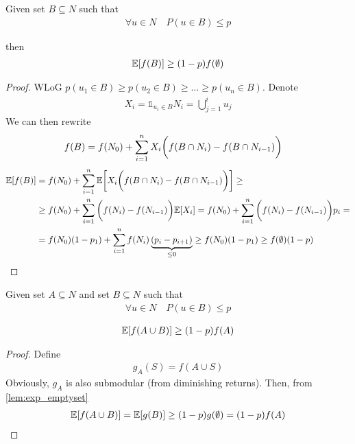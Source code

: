 \begin{lemma} \label{lem:exp_emptyset}
	Given  set $B\subseteq N$ such that
	\begin{align}
	\forall u \in  N \quad P(u\in B) \leq p
	\end{align}
	
	then
	\begin{align}
	\mathbb{E} \qty[f(B)] \geq (1-p)f(\emptyset)
	\end{align}
	\begin{proof}
		WLoG $p(u_1\in B) \geq p(u_2\in B) \geq \dots \geq p(u_n\in B)$. Denote 
		\begin{align}
		X_i = \mathds{1}_{u_i \in B}
		N_i = \bigcup_{j=1}^i u_j
		\end{align}
		We can then rewrite
		\begin{align}
		f(B) &= f(N_0) + \sum_{i=1}^n X_i\qty\bigg(f(B\cap N_{i}) - f(B\cap N_{i-1}))
		\end{align}
		\begin{align}
		\mathbb{E} \qty[f(B)] &= f(N_0) +\sum_{i=1}^n \mathbb{E} \qty[ X_i\qty\bigg(f(B\cap N_{i}) - f(B\cap N_{i-1}))]\geq\\&\geq f(N_0) +\sum_{i=1}^n \qty\bigg(f(N_{i}) - f(N_{i-1}))\mathbb{E} \qty[ X_i] =f(N_0) +\sum_{i=1}^n \qty\bigg(f(N_{i}) - f(N_{i-1}))p_i =\\&= f(N_0) (1-p_1) + \sum_{i=1}^n f(N_i)\underbrace{ (p_i-p_{i+1})}_{\leq 0} \geq f(N_0) (1-p_1)  \geq f(\emptyset) (1-p)
		\end{align}
		
	\end{proof}
\end{lemma}
\begin{lemma} \label{lem:exp}
	Given set $A\subseteq N$ and set $B\subseteq N$ such that
	\begin{align}
	\forall u \in  N \quad P(u\in B) \leq p
	\end{align}
	
	\begin{align}
	\mathbb{E} \qty[f(A\cup B)] \geq (1-p)f(A)
	\end{align}
	
	\begin{proof}
		Define
		\begin{align}
		g_A(S) = f(A\cup S) 
		\end{align}
		Obviously, $g_A$ is also submodular (from diminishing returns). Then, from \vref{lem:exp_emptyset}
		\begin{align}
		\mathbb{E} \qty[f(A\cup B)] = \mathbb{E} \qty[g(B)]\geq (1-p)g(\emptyset) = (1-p)f(A)
		\end{align}
	\end{proof}
\end{lemma}

